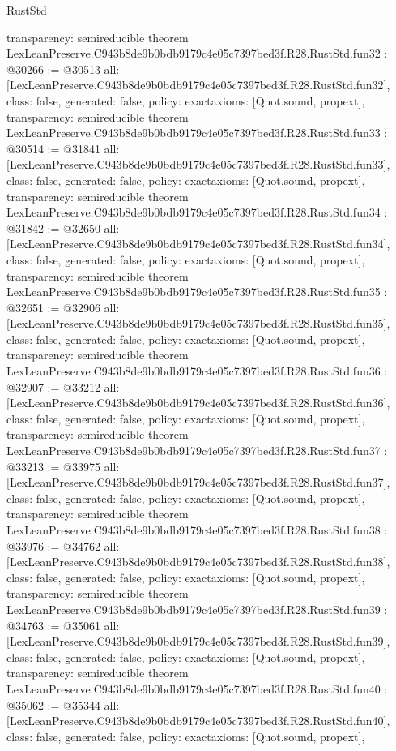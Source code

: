 \begin{lexlean}{RustStd}
\begin{coremodule}
{  transparency: semireducible
}
theorem LexLeanPreserve.C943b8de9b0bdb9179c4e05c7397bed3f.R28.RustStd.fun32 : @30266 := @30513 {
  all: [LexLeanPreserve.C943b8de9b0bdb9179c4e05c7397bed3f.R28.RustStd.fun32],
  class: false,
  generated: false,
  policy: exact{axioms: [Quot.sound, propext]},
  transparency: semireducible
}
theorem LexLeanPreserve.C943b8de9b0bdb9179c4e05c7397bed3f.R28.RustStd.fun33 : @30514 := @31841 {
  all: [LexLeanPreserve.C943b8de9b0bdb9179c4e05c7397bed3f.R28.RustStd.fun33],
  class: false,
  generated: false,
  policy: exact{axioms: [Quot.sound, propext]},
  transparency: semireducible
}
theorem LexLeanPreserve.C943b8de9b0bdb9179c4e05c7397bed3f.R28.RustStd.fun34 : @31842 := @32650 {
  all: [LexLeanPreserve.C943b8de9b0bdb9179c4e05c7397bed3f.R28.RustStd.fun34],
  class: false,
  generated: false,
  policy: exact{axioms: [Quot.sound, propext]},
  transparency: semireducible
}
theorem LexLeanPreserve.C943b8de9b0bdb9179c4e05c7397bed3f.R28.RustStd.fun35 : @32651 := @32906 {
  all: [LexLeanPreserve.C943b8de9b0bdb9179c4e05c7397bed3f.R28.RustStd.fun35],
  class: false,
  generated: false,
  policy: exact{axioms: [Quot.sound, propext]},
  transparency: semireducible
}
theorem LexLeanPreserve.C943b8de9b0bdb9179c4e05c7397bed3f.R28.RustStd.fun36 : @32907 := @33212 {
  all: [LexLeanPreserve.C943b8de9b0bdb9179c4e05c7397bed3f.R28.RustStd.fun36],
  class: false,
  generated: false,
  policy: exact{axioms: [Quot.sound, propext]},
  transparency: semireducible
}
theorem LexLeanPreserve.C943b8de9b0bdb9179c4e05c7397bed3f.R28.RustStd.fun37 : @33213 := @33975 {
  all: [LexLeanPreserve.C943b8de9b0bdb9179c4e05c7397bed3f.R28.RustStd.fun37],
  class: false,
  generated: false,
  policy: exact{axioms: [Quot.sound, propext]},
  transparency: semireducible
}
theorem LexLeanPreserve.C943b8de9b0bdb9179c4e05c7397bed3f.R28.RustStd.fun38 : @33976 := @34762 {
  all: [LexLeanPreserve.C943b8de9b0bdb9179c4e05c7397bed3f.R28.RustStd.fun38],
  class: false,
  generated: false,
  policy: exact{axioms: [Quot.sound, propext]},
  transparency: semireducible
}
theorem LexLeanPreserve.C943b8de9b0bdb9179c4e05c7397bed3f.R28.RustStd.fun39 : @34763 := @35061 {
  all: [LexLeanPreserve.C943b8de9b0bdb9179c4e05c7397bed3f.R28.RustStd.fun39],
  class: false,
  generated: false,
  policy: exact{axioms: [Quot.sound, propext]},
  transparency: semireducible
}
theorem LexLeanPreserve.C943b8de9b0bdb9179c4e05c7397bed3f.R28.RustStd.fun40 : @35062 := @35344 {
  all: [LexLeanPreserve.C943b8de9b0bdb9179c4e05c7397bed3f.R28.RustStd.fun40],
  class: false,
  generated: false,
  policy: exact{axioms: [Quot.sound, propext]},
}
\end{coremodule}
\end{lexlean}
